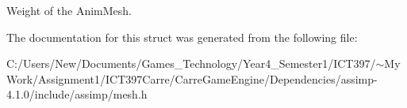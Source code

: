 Weight of the AnimMesh. 

The documentation for this struct was generated from the following file:\begin{CompactItemize}
\item 
C:/Users/New/Documents/Games\_\-Technology/Year4\_\-Semester1/ICT397/$\sim$My Work/Assignment1/ICT397Carre/CarreGameEngine/Dependencies/assimp-4.1.0/include/assimp/mesh.h\end{CompactItemize}
